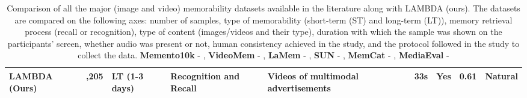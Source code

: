 \begin{landscape}
\begin{table}
{\begin{tabularx}{1.5\textwidth}{>{\hsize=0.4\hsize\bfseries}X>{\hsize=0.3\hsize}X>{\hsize=0.5\hsize}X>{\hsize=0.35\hsize}X>{\hsize=0.85\hsize}X>{\hsize=0.35\hsize}X>{\hsize=0.3\hsize}X>{\hsize=0.3\hsize}X>{\hsize=0.4\hsize}X}
\textbf{LAMBDA (Ours)} & 2,205 & LT (1-3 days) & \textbf{Recognition and Recall }& Videos of multimodal advertisements & \textbf{33s} & \textbf{Yes} & \textbf{0.61} & \textbf{Natural} \\ \hline
\end{tabularx}%
}
\caption{\label{tab:dataset_comparison} Comparison of all the major (image and video) memorability datasets available in the literature along with LAMBDA (ours). The datasets are compared on the following axes: number of samples, type of memorability (short-term (ST) and long-term (LT)), memory retrieval process (recall or recognition), type of content (images/videos and their type), duration with which the sample was shown on the participants' screen, whether audio was present or not, human consistency achieved in the study, and the protocol followed in the study to collect the data.
\textbf{Memento10k} - \protect\cite{newman2020multimodal},
\textbf{VideoMem} - \protect\cite{cohendet2019videomem},
\textbf{LaMem} - \protect\cite{khosla2015understanding},
\textbf{SUN} - \protect\cite{isola2011makes},
\textbf{MemCat} - \protect\cite{goetschalckx2019memcat},
\textbf{MediaEval} - \protect\cite{Kiziltepe_2021}
}
\end{table}
\end{landscape}

